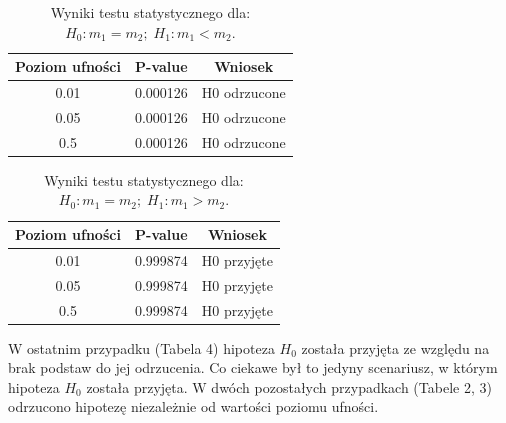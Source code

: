 \documentclass{scrartcl}
\begin{document}
\begin{table}[H]
  \center

  \begin{tabular}{|c|c|c|}
    \textbf{Poziom ufności} & \textbf{P-value} & \textbf{Wniosek} \\ \hline
    0.01                    & 0.000126         & H0 odrzucone \\
    0.05                    & 0.000126         & H0 odrzucone \\
    0.5                     & 0.000126         & H0 odrzucone \\
  \end{tabular}

  \caption{Wyniki testu statystycznego dla: $H_0: m_1 = m_2; \; H_1: m_1 < m_2$.}
\end{table}

\begin{table}[H]
  \center

  \begin{tabular}{|c|c|c|}
    \textbf{Poziom ufności} & \textbf{P-value} & \textbf{Wniosek} \\ \hline
    0.01                    & 0.999874         & H0 przyjęte \\
    0.05                    & 0.999874         & H0 przyjęte \\
    0.5                     & 0.999874         & H0 przyjęte \\
  \end{tabular}

  \caption{Wyniki testu statystycznego dla: $H_0: m_1 = m_2; \; H_1: m_1 > m_2$.}
\end{table}

W ostatnim przypadku (Tabela 4) hipoteza $H_0$ została przyjęta ze względu
na brak podstaw do jej odrzucenia. Co ciekawe był to jedyny scenariusz, w którym
hipoteza $H_0$ została przyjęta. W dwóch pozostałych przypadkach (Tabele 2, 3)
odrzucono hipotezę niezależnie od wartości poziomu ufności.
\end{document}
